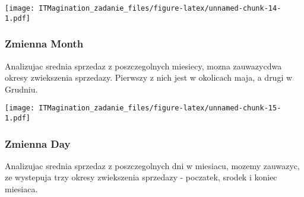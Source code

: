 \documentclass[]{article}
\newenvironment{Shaded}{\begin{snugshade}}{\end{snugshade}}
\newcommand{\DataTypeTok}[1]{\textcolor[rgb]{0.13,0.29,0.53}{#1}}
\newcommand{\KeywordTok}[1]{\textcolor[rgb]{0.13,0.29,0.53}{\textbf{#1}}}
\newcommand{\NormalTok}[1]{#1}
\newcommand{\OperatorTok}[1]{\textcolor[rgb]{0.81,0.36,0.00}{\textbf{#1}}}
\newcommand{\StringTok}[1]{\textcolor[rgb]{0.31,0.60,0.02}{#1}}
\begin{document}
\texttt{[image: ITMagination\_zadanie\_files/figure-latex/unnamed-chunk-14-1.pdf]}

\hypertarget{zmienna-month}{%
\subsubsection{Zmienna Month}\label{zmienna-month}}

Analizujac srednia sprzedaz z poszczegolnych miesiecy, mozna zauwazycdwa
okresy zwiekszenia sprzedazy. Pierwszy z nich jest w okolicach maja, a
drugi w Grudniu.

\begin{Shaded}
\end{Shaded}

\texttt{[image: ITMagination\_zadanie\_files/figure-latex/unnamed-chunk-15-1.pdf]}

\hypertarget{zmienna-day}{%
\subsubsection{Zmienna Day}\label{zmienna-day}}

Analizujac srednia sprzedaz z poszczegolnych dni w miesiacu, mozemy
zauwazyc, ze wystepuja trzy okresy zwiekszenia sprzedazy - poczatek,
srodek i koniec miesiaca.

\begin{Shaded}
\end{Shaded}
\end{document}
